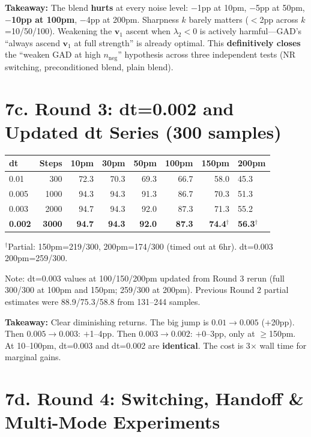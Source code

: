 \documentclass[11pt]{article}
\begin{document}
\textbf{Takeaway:} The blend \textbf{hurts} at every noise level: $-$1pp at 10pm, $-$5pp at 50pm, \textbf{$-$10pp at 100pm}, $-$4pp at 200pm. Sharpness $k$ barely matters ($<$2pp across $k$=10/50/100).
Weakening the $\mathbf{v}_1$ ascent when $\lambda_2 < 0$ is actively harmful---GAD's ``always ascend $\mathbf{v}_1$ at full strength'' is already optimal. This \textbf{definitively closes} the ``weaken GAD at high $n_{\text{neg}}$'' hypothesis across three independent tests (NR switching, preconditioned blend, plain blend).

\section*{7c. Round 3: dt=0.002 and Updated dt Series \small(300 samples)}

\begin{tabular}{l*{6}{r}l}
\toprule
dt & Steps & 10pm & 30pm & 50pm & 100pm & 150pm & 200pm \\
\midrule
0.01  & 300  & 72.3 & 70.3 & 69.3 & 66.7 & 58.0 & 45.3 \\
0.005 & 1000 & 94.3 & 94.3 & 91.3 & 86.7 & 70.3 & 51.3 \\
0.003 & 2000 & 94.7 & 94.3 & 92.0 & 87.3 & 71.3 & 55.2 \\
\textbf{0.002} & \textbf{3000} & \textbf{94.7} & \textbf{94.3} & \textbf{92.0} & \textbf{87.3} & \textbf{74.4}$^\dagger$ & \textbf{56.3}$^\dagger$ \\
\bottomrule
\end{tabular}

{\small $^\dagger$Partial: 150pm=219/300, 200pm=174/300 (timed out at 6hr). dt=0.003 200pm=259/300.}

Note: dt=0.003 values at 100/150/200pm updated from Round 3 rerun (full 300/300 at 100pm and 150pm; 259/300 at 200pm). Previous Round 2 partial estimates were 88.9/75.3/58.8 from 131--244 samples.

\textbf{Takeaway:} Clear diminishing returns. The big jump is $0.01 \to 0.005$ ($+$20pp).
Then $0.005 \to 0.003$: $+$1--4pp. Then $0.003 \to 0.002$: $+$0--3pp, only at $\geq$150pm.
At 10--100pm, dt=0.003 and dt=0.002 are \textbf{identical}. The cost is 3$\times$ wall time for marginal gains.

\section*{7d. Round 4: Switching, Handoff \& Multi-Mode Experiments}
\end{document}
